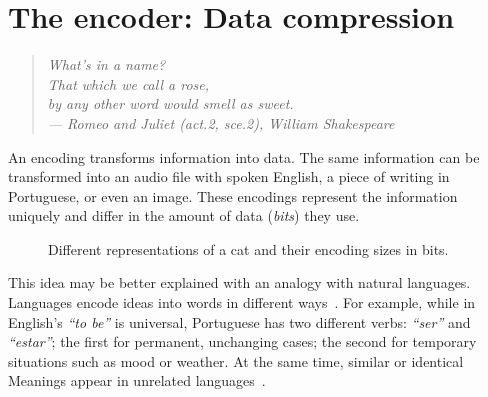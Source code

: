 \section{The encoder: Data compression}
\begin{quotation}
	\small \emph{ \flushright What’s in a name? \\
That which we call a rose,\\
by any other word would smell as sweet.\\
	\flushright --- Romeo and Juliet (act.2, sce.2), William Shakespeare\\
	\vspace{1cm} }
\end{quotation}
An encoding transforms information into data. The same information can be transformed into an audio file with spoken English, a piece of writing in Portuguese, or even an image. These encodings represent the information uniquely and differ in the amount of data (\emph{bits}) they use.

	\begin{figure}[hbt!]
		\centering
\caption{Different representations of a cat and their encoding sizes in bits.}
\end{figure}






This idea may be better explained with an analogy with natural languages. Languages encode ideas into words in different ways~\cite{zaslavsky:2018}. For example, while in English's \emph{``to be''} is universal, Portuguese has two different verbs: \emph{``ser''} and \emph{``estar''}; the first for permanent, unchanging cases; the second for temporary situations such as mood or weather. At the same time, similar or identical
Meanings appear in unrelated languages~\cite{zaslavsky:2018}.


